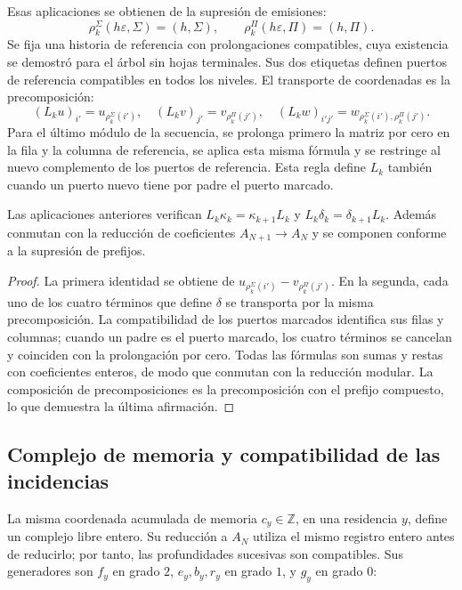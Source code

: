 Esas aplicaciones se obtienen de la supresión de emisiones:
\[
\rho_k^\Sigma(h\varepsilon,\Sigma)=(h,\Sigma),\qquad
\rho_k^\Pi(h\varepsilon,\Pi)=(h,\Pi).
\]
Se fija una historia de referencia con prolongaciones compatibles, cuya existencia se demostró para el árbol sin hojas terminales. Sus dos etiquetas definen puertos de referencia compatibles en todos los niveles. El transporte de coordenadas es la precomposición:
\[
(L_ku)_{i'}=u_{\rho_k^\Sigma(i')},\quad
(L_kv)_{j'}=v_{\rho_k^\Pi(j')},\quad
(L_kw)_{i'j'}=w_{\rho_k^\Sigma(i'),\rho_k^\Pi(j')}.
\]
Para el último módulo de la secuencia, se prolonga primero la matriz por cero en la fila y la columna de referencia, se aplica esta misma fórmula y se restringe al nuevo complemento de los puertos de referencia. Esta regla define \(L_k\) también cuando un puerto nuevo tiene por padre el puerto marcado.

\begin{proposition}
\label{x_reciprocidad:iv:rectangular-natural}
Las aplicaciones anteriores verifican
\(L_k\kappa_k=\kappa_{k+1}L_k\) y
\(L_k\delta_k=\delta_{k+1}L_k\).
Además conmutan con la reducción de coeficientes
\(A_{N+1}\to A_N\) y se componen conforme a la supresión de prefijos.
\end{proposition}
\begin{proof}
La primera identidad se obtiene de
\(u_{\rho_k^\Sigma(i')}-v_{\rho_k^\Pi(j')}\).
En la segunda, cada uno de los cuatro términos que define \(\delta\)
se transporta por la misma precomposición. La compatibilidad de los
puertos marcados identifica sus filas y columnas; cuando un padre es
el puerto marcado, los cuatro términos se cancelan y coinciden con
la prolongación por cero. Todas las fórmulas son sumas y restas con
coeficientes enteros, de modo que conmutan con la reducción modular.
La composición de precomposiciones es la precomposición con el
prefijo compuesto, lo que demuestra la última afirmación.
\end{proof}

\subsection{Complejo de memoria y compatibilidad de las incidencias}
\label{x_reciprocidad:iv:cont:memoria}
La misma coordenada acumulada de memoria \(c_y\in\mathbb Z\), en una residencia \(y\), define un complejo libre entero. Su reducción a \(A_N\) utiliza el mismo registro entero antes de reducirlo; por tanto, las profundidades sucesivas son compatibles. Sus generadores son \(f_y\) en grado \(2\), \(e_y,b_y,r_y\) en grado \(1\), y \(g_y\) en grado \(0\):

